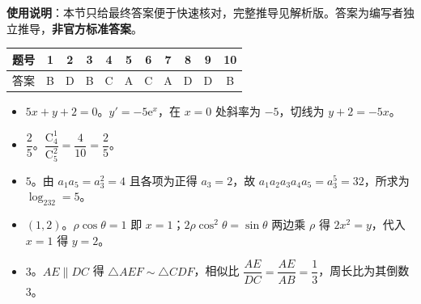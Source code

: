 
\begin{gknotice}
\textbf{使用说明}：本节只给最终答案便于快速核对，完整推导见解析版。答案为编写者独立推导，\textbf{非官方标准答案}。
\end{gknotice}

\begin{center}\begin{tabular}{ccccccccccc}
\toprule
题号 & 1 & 2 & 3 & 4 & 5 & 6 & 7 & 8 & 9 & 10 \\
\midrule
答案 & B & D & B & C & A & C & A & D & D & B \\
\bottomrule
\end{tabular}\end{center}

\begin{itemize}[leftmargin=2.6em]
  \item[\textbf{11.}] $5x+y+2=0$。$y'=-5\mathrm e^x$，在 $x=0$ 处斜率为 $-5$，切线为 $y+2=-5x$。
  \item[\textbf{12.}] $\dfrac25$。$\dfrac{\mathrm C_4^1}{\mathrm C_5^2}=\dfrac4{10}=\dfrac25$。
  \item[\textbf{13.}] $5$。由 $a_1a_5=a_3^2=4$ 且各项为正得 $a_3=2$，故 $a_1a_2a_3a_4a_5=a_3^5=32$，所求为 $\log_232=5$。
  \item[\textbf{14.}] $(1,2)$。$\rho\cos\theta=1$ 即 $x=1$；$2\rho\cos^2\theta=\sin\theta$ 两边乘 $\rho$ 得 $2x^2=y$，代入 $x=1$ 得 $y=2$。
  \item[\textbf{15.}] $3$。$AE\parallel DC$ 得 $\triangle AEF\sim\triangle CDF$，相似比 $\dfrac{AE}{DC}=\dfrac{AE}{AB}=\dfrac13$，周长比为其倒数 $3$。
\end{itemize}

